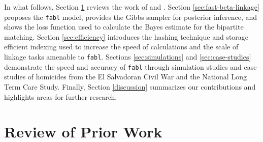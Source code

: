 \documentclass[ba]{imsart}
\begin{document}

In what follows, Section \ref{sec:review-of_prior-work} reviews the work of \cite{fellegi_theory_1969} and \cite{sadinle_bayesian_2017}. Section \ref{sec:fast-beta-linkage} proposes the \texttt{fabl} model, provides the Gibbs sampler for posterior inference, and shows the loss function used to calculate the Bayes estimate for the bipartite matching. Section \ref{sec:efficiency} introduces the hashing technique and storage efficient indexing used to increase the speed of calculations and the scale of linkage tasks amenable to \texttt{fabl}. Sections \ref{sec:simulations} and \ref{sec:case-studies} demonstrate the speed and accuracy of \texttt{fabl} through simulation studies and case studies of homicides from the El Salvadoran Civil War and the National Long Term Care Study. Finally, Section \ref{discussion} summarizes our contributions and highlights areas for further research.

\section{Review of Prior Work}
\label{sec:review-of_prior-work}

\end{document}

